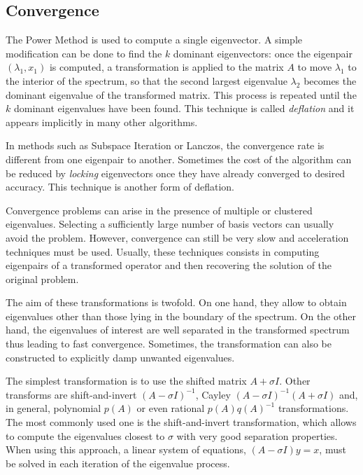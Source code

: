 \subsection{Convergence}

	The Power Method is used to compute a single eigenvector. A simple modification can be done to find the $k$ dominant eigenvectors: once the eigenpair $(\lambda_1,x_1)$ is computed, a transformation is applied to the matrix $A$ to move $\lambda_1$ to the interior of the spectrum, so that the second largest eigenvalue $\lambda_2$ becomes the dominant eigenvalue of the transformed matrix. This process is repeated until the $k$ dominant eigenvalues have been found. This technique is called {\em deflation\/} and it appears implicitly in many other algorithms.

	In methods such as Subspace Iteration or Lanczos, the convergence rate is different from one eigenpair to another. Sometimes the cost of the algorithm can be reduced by {\em locking\/} eigenvectors once they have already converged to desired accuracy. This technique is another form of deflation.

	Convergence problems can arise in the presence of multiple or clustered eigenvalues. Selecting a sufficiently large number of basis vectors can usually avoid the problem. However, convergence can still be very slow and acceleration techniques must be used. Usually, these techniques consists in computing eigenpairs of a transformed operator and then recovering the solution of the original problem. 

	The aim of these transformations is twofold. On one hand, they allow to obtain eigenvalues other than those lying in the boundary of the spectrum. On the other hand, the eigenvalues of interest are well separated in the transformed spectrum thus leading to fast convergence. Sometimes, the transformation can also be constructed to explicitly damp unwanted eigenvalues.

	The simplest transformation is to use the shifted matrix $A+\sigma I$. Other transforms are shift-and-invert $(A-\sigma I)^{-1}$, Cayley $(A-\sigma I)^{-1}(A+\sigma I)$ and, in general, polynomial $p(A)$ or even rational $p(A)q(A)^{-1}$ transformations. The most commonly used one is the shift-and-invert transformation, which allows to compute the eigenvalues closest to $\sigma$ with very good separation properties. When using this approach, a linear system of equations, $(A-\sigma I)y=x$, must be solved in each iteration of the eigenvalue process.

